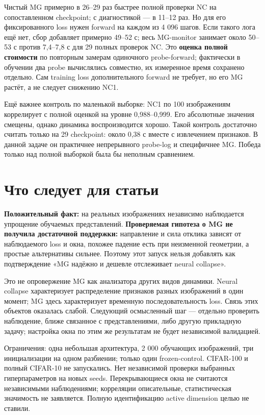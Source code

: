 \documentclass[10pt,a4paper]{article}
\begin{document}
Чистый MG примерно в 26--29 раз быстрее полной проверки NC на сопоставленном checkpoint; с диагностикой --- в 11--12 раз. Но для его фиксированного loss нужен forward на каждом из 4 096 шагов. Если такого лога ещё нет, сбор добавляет примерно 49--52 с; весь MG-monitor занимает около 50--53 с против 7,4--7,8 с для 29 полных проверок NC. Это \textbf{оценка полной стоимости} по повторным замерам одиночного probe-forward; фактически в обучении два probe вычислялись совместно, их измеренное время сохранено отдельно. Сам training loss дополнительного forward не требует, но его MG растёт, а не следует снижению NC1.

Ещё важнее контроль по маленькой выборке: NC1 по 100 изображениям коррелирует с полной оценкой на уровне 0,988--0,999. Его абсолютные значения смещены, однако динамика воспроизводится хорошо. Такой контроль достаточно считать только на 29 checkpoint: около 0,38 с вместе с извлечением признаков. В данной задаче он практичнее непрерывного probe-log и специфичнее MG. Победа только над полной выборкой была бы неполным сравнением.

\section*{Что следует для статьи}

\textbf{Положительный факт:} на реальных изображениях независимо наблюдается упрощение обучаемых представлений. \textbf{Проверяемая гипотеза о MG не получила достаточной поддержки:} направление и сила отклика зависят от наблюдаемого loss и окна, похожее падение есть при неизменной геометрии, а простые альтернативы сильнее. Поэтому этот запуск нельзя добавлять как подтверждение «MG надёжно и дешевле отслеживает neural collapse».

Это не опровержение MG как анализатора других видов динамики. Neural collapse характеризует распределение признаков разных изображений в один момент; MG здесь характеризует временную последовательность loss. Связь этих объектов оказалась слабой. Следующий осмысленный шаг --- отдельно проверить наблюдение, ближе связанное с представлениями, либо другую прикладную задачу; настройка окна по этим же результатам не будет независимой валидацией.

Ограничения: одна небольшая архитектура, 2 000 обучающих изображений, три инициализации на одном разбиении; только один frozen-control. CIFAR-100 и полный CIFAR-10 не запускались. Нет независимой проверки выбранных гиперпараметров на новых seeds. Перекрывающиеся окна не считаются независимыми наблюдениями; корреляции описательные, статистическая значимость не заявляется. Полную идентификацию active dimension целью не ставили.
\end{document}
